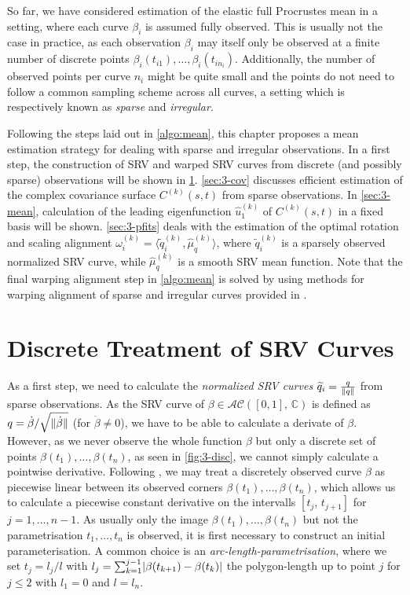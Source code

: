 \label{sec:3}
So far, we have considered estimation of the elastic full Procrustes mean in a setting, where each curve $\beta_i$ is assumed fully observed.
This is usually not the case in practice, as each observation $\beta_i$ may itself only be observed at a finite number of discrete points $\beta_i(t_{i1}), \dots, \beta_i(t_{in_i})$.
Additionally, the number of observed points per curve $n_i$ might be quite small and the points do not need to follow a common sampling scheme across all curves, a setting which is respectively known as \emph{sparse} and \emph{irregular}.

Following the steps laid out in \cref{algo:mean}, this chapter proposes a mean estimation strategy for dealing with sparse and irregular observations.
In a first step, the construction of SRV and warped SRV curves from discrete (and possibly sparse) observations will be shown in \cref{sec:3-discrete}.
\cref{sec:3-cov} discusses efficient estimation of the complex covariance surface $C^{(k)}(s,t)$ from sparse observations.
In \cref{sec:3-mean}, calculation of the leading eigenfunction $\hat u^{(k)}_1$ of $C^{(k)}(s,t)$ in a fixed basis will be shown.
\cref{sec:3-pfits} deals with the estimation of the optimal rotation and scaling alignment $\omega_i^{(k)} = \langle \widetilde q_i^{(k)}, \hat\mu^{(k)}_q \rangle$, where $\widetilde q_i^{(k)}$ is a sparsely observed normalized SRV curve, while $\hat\mu^{(k)}_q$ is a smooth SRV mean function.
Note that the final warping alignment step in \cref{algo:mean} is solved by using methods for warping alignment of sparse and irregular curves provided in \cite{Steyer2021}.


\section{Discrete Treatment of SRV Curves}
\label{sec:3-discrete}
As a first step, we need to calculate the \emph{normalized SRV curves} $\widetilde q_i = \frac{q}{\lVert q\rVert}$ from sparse observations.
As the SRV curve of $\beta \in \mathcal{AC}([0,1],\,\mathbb{C})$ is defined as $q = \dot\beta / \sqrt{\lVert\dot\beta\rVert}$ (for $\dot\beta \neq 0$), we have to be able to calculate a derivate of $\beta$.
However, as we never observe the whole function $\beta$ but only a discrete set of points $\beta(t_1),\dots,\beta(t_n)$, as seen in \cref{fig:3-disc}, we cannot simply calculate a pointwise derivative.
Following \cite{Steyer2021}, we may treat a discretely observed curve $\beta$ as piecewise linear between its observed corners $\beta(t_1),\dots,\beta(t_n)$, which allows us to calculate a piecewise constant derivative on the intervalls $[t_j,\,t_{j+1}]$ for $j=1,\dots,n-1$.
As usually only the image $\beta(t_1),\dots,\beta(t_n)$ but not the parametrisation $t_1,\dots,t_n$ is observed, it is first necessary to construct an initial parameterisation.
A common choice is an \emph{arc-length-parametrisation}, where we set $t_j = l_j/l$ with $l_j = \sum_{k=1}^{j-1} \lvert\beta(t_{k+1}) - \beta(t_k)\rvert$ the polygon-length up to point $j$ for $j \leq 2$ with $l_1 = 0$ and $l= l_n$.

